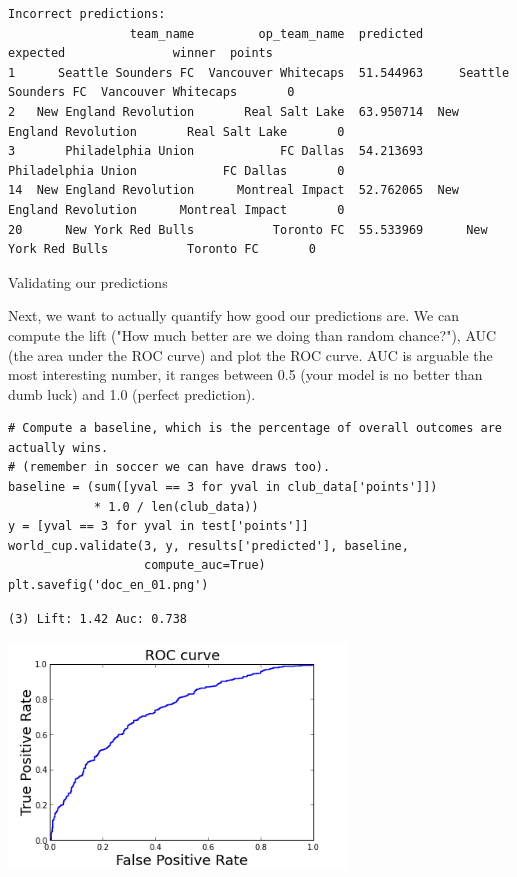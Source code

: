 \documentclass[12pt,fleqn]{article}\usepackage{common}
\begin{document}
\begin{verbatim}
Incorrect predictions:
                 team_name         op_team_name  predicted                expected               winner  points
1      Seattle Sounders FC  Vancouver Whitecaps  51.544963     Seattle Sounders FC  Vancouver Whitecaps       0
2   New England Revolution       Real Salt Lake  63.950714  New England Revolution       Real Salt Lake       0
3       Philadelphia Union            FC Dallas  54.213693      Philadelphia Union            FC Dallas       0
14  New England Revolution      Montreal Impact  52.762065  New England Revolution      Montreal Impact       0
20      New York Red Bulls           Toronto FC  55.533969      New York Red Bulls           Toronto FC       0
\end{verbatim}


Validating our predictions

Next, we want to actually quantify how good our predictions are. We can
compute the lift ("How much better are we doing than random chance?"), AUC
(the area under the ROC curve) and plot the ROC curve. AUC is arguable the
most interesting number, it ranges between 0.5 (your model is no better
than dumb luck) and 1.0 (perfect prediction).

\begin{verbatim}
# Compute a baseline, which is the percentage of overall outcomes are actually wins.
# (remember in soccer we can have draws too).
baseline = (sum([yval == 3 for yval in club_data['points']]) 
            * 1.0 / len(club_data))
y = [yval == 3 for yval in test['points']]
world_cup.validate(3, y, results['predicted'], baseline, 
                   compute_auc=True)
plt.savefig('doc_en_01.png')
\end{verbatim}

\begin{verbatim}
(3) Lift: 1.42 Auc: 0.738
\end{verbatim}

\includegraphics[height=6cm]{doc_en_01.png}
\end{document}
